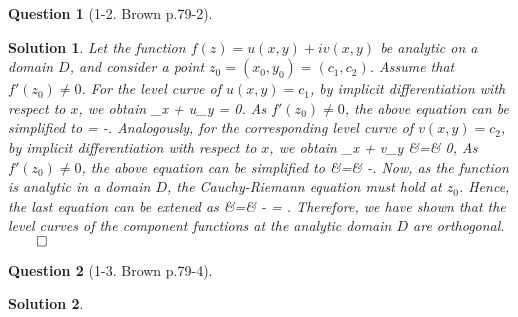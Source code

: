 \documentclass{article} %
\def\eQb#1\eQe{\begin{eqnarray*}#1\end{eqnarray*}}
\theoremstyle{quest}
\newtheorem*{question}{Question}
\newtheorem*{solution}{Solution}
\begin{document}
\begin{question}[1-2. Brown p.79-2]
\end{question}
\begin{solution}
Let the function $f(z) = u(x,y) + iv(x,y)$ be analytic on a domain $D$,
and consider a point $z_0 = (x_0, y_0) = (c_1, c_2)$. Assume that $f'(z_0) \neq 0$.
For the level curve of $u(x,y) = c_1$, by implicit differentiation
with respect to $x$, we obtain 
\eQb
u_x + u_y  = 0. 
\eQe
As $f'(z_0) \neq 0$, the above equation can be simplified to 
\eQb
\dfrac{dy}{dx} = -.
\eQe
Analogously, for the corresponding 
level curve of $v(x,y) = c_2$, by implicit differentiation
with respect to $x$, we obtain
\eQb
v_x + v_y  &=& 0,
\eQe
As $f'(z_0) \neq 0$, the above equation can be simplified to 
\eQb
\dfrac{dy}{dx} &=& -.
\eQe
Now, as the function is analytic in a domain $D$, the Cauchy-Riemann equation must hold 
at $z_0$. Hence, the last equation can be extened as
\eQb
\dfrac{dy}{dx} &=& - = . 
\eQe
Therefore, we have shown that the level curves of the component functions
at the analytic domain $D$ are orthogonal. $\qed$
\end{solution}

\bigskip


\begin{question}[1-3. Brown p.79-4]
\end{question}
\begin{solution}

\end{solution}

\bigskip
\end{document}
